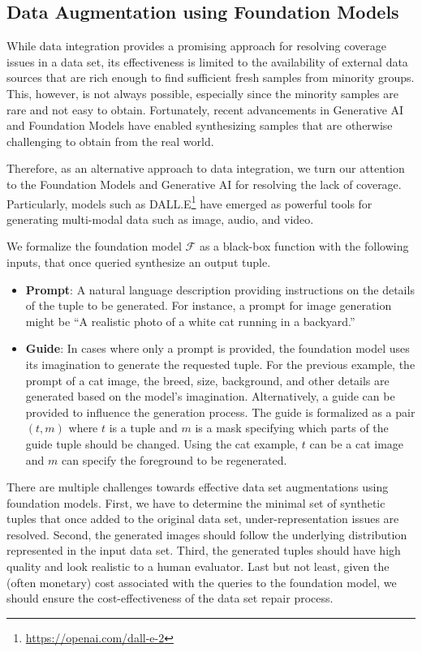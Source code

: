 \documentclass[11pt]{article}
\newcommand{\fm}{$\mathcal{F}$\xspace}
\begin{document}
\subsection{Data Augmentation using Foundation Models}

While data integration provides a promising approach for resolving coverage issues in a data set, its effectiveness is limited to the availability of external data sources that are rich enough to find sufficient fresh samples from minority groups. This, however, is not always possible, especially since the minority samples are rare and not easy to obtain.
Fortunately, recent advancements in Generative AI and Foundation Models have enabled synthesizing samples that are otherwise challenging to obtain from the real world.

Therefore, as an alternative approach to data integration, we turn our attention to the Foundation Models and Generative AI for resolving the lack of coverage. 
Particularly, models such as {\sc DALL.E}\footnote{\url{https://openai.com/dall-e-2}} have emerged as powerful tools for generating multi-modal data such as image, audio, and video.
 
We formalize the foundation model \fm as a black-box function with the following inputs, that once queried synthesize an output tuple.
\begin{itemize}
    \item {\bf Prompt}: A natural language description providing instructions on the details of the tuple to be generated. For instance, a prompt for image generation might be ``A realistic photo of a white cat running in a backyard.''
    \item {\bf Guide}: In cases where only a prompt is provided, the foundation model uses its imagination to generate the requested tuple. For the previous example, the prompt of a cat image, the breed, size, background, and other details are generated based on the model's imagination. Alternatively, a guide can be provided to influence the generation process. The guide is formalized as a pair $(t,m)$ where $t$ is a tuple and $m$ is a mask specifying which parts of the guide tuple should be changed. Using the cat example, $t$ can be a cat image and $m$ can specify the foreground to be regenerated.
\end{itemize}

There are multiple challenges towards effective data set augmentations using foundation models. 
First, we have to determine the minimal set of synthetic tuples that once added to the original data set, under-representation issues are resolved.
Second, the generated images should follow the underlying distribution represented in the input data set. Third, the generated tuples should have high quality and look realistic to a human evaluator. Last but not least, given the (often monetary) cost associated with the queries to the foundation model, we should ensure the cost-effectiveness of the data set repair process.
\end{document}
